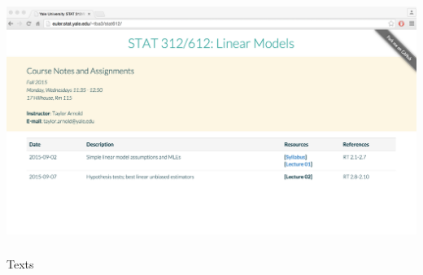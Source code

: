 \begin{frame}[fragile] \frametitle{}

\includegraphics[width=\linewidth]{img/websiteScreenshot.pdf}

\end{frame}

\begin{frame}[fragile] \frametitle{}

\begin{flushright}
{\color{yaleblue}\sc\fontsize{1cm}{0cm}\selectfont Texts}
\end{flushright}

\end{frame}

